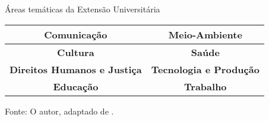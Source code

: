 \begin{quadro}[H]
\centering
\caption{Áreas temáticas da Extensão Universitária}
\begin{tabular}{|c|c|}
\hline
\textbf{Comunicação}                & \textbf{Meio-Ambiente}         \\ \hline
\textbf{Cultura}                    & \textbf{Saúde}                 \\ \hline
\textbf{Direitos Humanos e Justiça} & \textbf{Tecnologia e Produção} \\ \hline
\textbf{Educação}                   & \textbf{Trabalho}              \\ \hline
\end{tabular}
\newline
\newline
Fonte: O autor, adaptado de \cite{forproex2016}.
\end{quadro}

